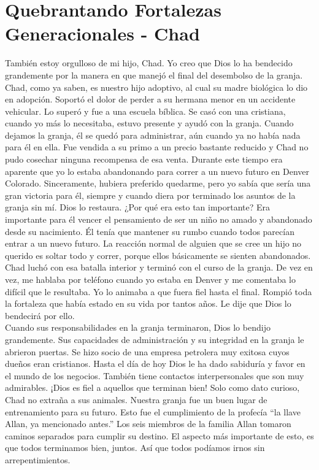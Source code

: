 \documentclass[twoside, 12pt]{book}
\begin{document}
\section{Quebrantando Fortalezas Generacionales - Chad}

También estoy orgulloso de mi hijo, Chad. Yo creo que Dios lo ha bendecido grandemente por la manera en que manejó el final del desembolso de la granja. Chad, como ya saben, es nuestro hijo adoptivo, al cual su madre biológica lo dio en adopción. Soportó el dolor de perder a su hermana menor en un accidente vehicular. Lo superó y fue a una escuela bíblica. Se casó con una cristiana,  cuando yo más lo necesitaba, estuvo presente y ayudó con la granja. Cuando dejamos la granja, él se quedó para administrar, aún cuando ya no había nada para él en ella. Fue vendida a su primo a un precio bastante reducido y Chad no pudo cosechar ninguna recompensa de esa venta. Durante este tiempo era aparente que yo lo estaba abandonando para correr a un nuevo futuro en Denver Colorado. Sinceramente, hubiera preferido quedarme, pero yo sabía que sería una gran victoria para él, siempre y cuando diera por terminado los asuntos de la granja sin mí. Dios lo restaura. ¿Por qué era esto tan importante? Era importante para él vencer el pensamiento de ser un niño no amado y abandonado desde su nacimiento. Él tenía que mantener su rumbo cuando todos parecían entrar a un nuevo futuro. La reacción normal de alguien que se cree un hijo no querido es soltar todo y correr, porque ellos básicamente se sienten abandonados. Chad luchó con esa batalla interior y terminó con el curso de la granja. De vez en vez, me hablaba por teléfono cuando yo estaba en Denver y me comentaba lo difícil que le resultaba. Yo lo animaba a que fuera fiel hasta el final. Rompió toda la fortaleza que había estado en su vida por tantos años. Le dije que Dios lo bendecirá por ello.\\

Cuando sus responsabilidades en la granja terminaron, Dios lo bendijo grandemente. Sus capacidades de administración y su integridad en la granja le abrieron puertas. Se hizo socio de una empresa petrolera muy exitosa cuyos dueños eran cristianos. Hasta el día de hoy Dios le ha dado sabiduría y favor en el mundo de los negocios. También tiene contactos interpersonales que son muy admirables. ¡Dios es fiel a aquellos que terminan bien! Solo como dato curioso, Chad no extraña a sus animales. Nuestra granja fue un buen lugar de entrenamiento para su futuro. Esto fue el cumplimiento de la profecía “la llave Allan, ya mencionado antes.” Los seis miembros de la familia Allan tomaron caminos separados para cumplir su destino. El aspecto más importante de esto, es que todos terminamos bien, juntos. Así que todos podíamos irnos sin arrepentimientos.\\
\end{document}
